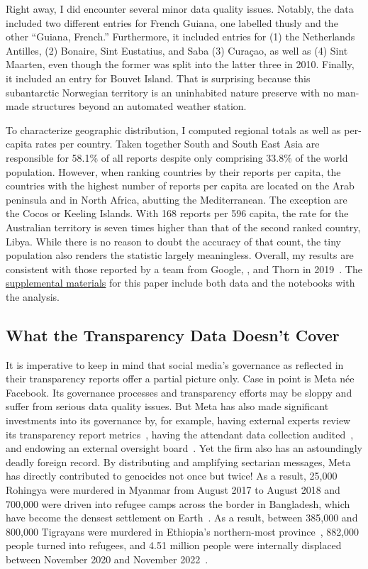 Right away, I did encounter several minor data quality issues. Notably, the data
included two different entries for French Guiana, one labelled thusly and the
other ``Guiana, French.'' Furthermore, it included entries for (1) the
Netherlands Antilles, (2) Bonaire, Sint Eustatius, and Saba (3) Curaçao, as well
as (4) Sint Maarten, even though the former was split into the latter three in
2010. Finally, it included an entry for Bouvet Island. That is surprising
because this subantarctic Norwegian territory is an uninhabited nature preserve
with no man-made structures beyond an automated weather station.

To characterize geographic distribution, I computed regional totals as well as
per-capita rates per country. Taken together South and South East Asia are
responsible for 58.1\% of all reports despite only comprising 33.8\% of the
world population. However, when ranking countries by their reports per capita,
the countries with the highest number of reports per capita are located on the
Arab peninsula and in North Africa, abutting the Mediterranean. The exception are
the Cocos or Keeling Islands. With 168 reports per 596 capita, the rate for the
Australian territory is seven times higher than that of the second ranked
country, Libya. While there is no reason to doubt the accuracy of that count,
the tiny population also renders the statistic largely meaningless. Overall, my
results are consistent with those reported by a team from Google, , and
Thorn in 2019~\cite{BurszteinBrightea2019}. The
\href{https://github.com/apparebit/penal-colony}{supplemental materials} for
this paper include both data and the notebooks with the analysis.


\subsection{What the Transparency Data Doesn't Cover}
\label{sec:census-limits}

It is imperative to keep in mind that social media's governance as reflected in
their transparency reports offer a partial picture only. Case in point is Meta
n\'ee Facebook. Its governance processes and transparency efforts may be sloppy
and suffer from serious data quality issues. But Meta has also made significant
investments into its governance by, for example, having external experts review
its transparency report metrics~\cite{BradfordGriselea2019}, having the
attendant data collection audited~\cite{Sarang2022}, and endowing an external
oversight board~\cite{BoteroMarinoGreeneea2020}. Yet the firm also has an
astoundingly deadly foreign record. By distributing and amplifying sectarian
messages, Meta has directly contributed to genocides not once but twice! As a
result, 25,000 Rohingya were murdered in Myanmar from August 2017 to August 2018
and 700,000 were driven into refugee camps across the border in Bangladesh,
which have become the densest settlement on
Earth~\cite{DeGuzman2022,HumanRightsCouncil2018}. As a result, between 385,000
and 800,000 Tigrayans were murdered in Ethiopia's northern-most
province~\cite{AnnysVandenBemptea2021,ChothiaBekit2022}, 882,000 people turned
into refugees, and 4.51 million people were internally displaced between
November 2020 and November 2022~\cite{UNICEF2023}.

